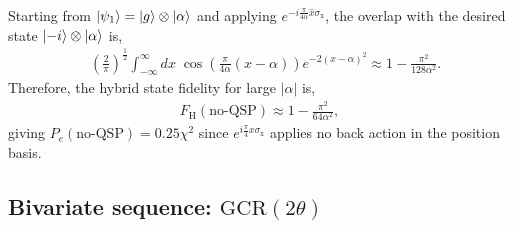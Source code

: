 \documentclass[aps,prx,showpacs,notitlepage,twocolumn,superscriptaddress,nofootinbib,preprintnumbers,floatfix,10pt, longbibliography]{revtex4-2}
\begin{document}
Starting from $\ket{\psi_1}=\ket{g}\otimes\ket{\alpha}$ and applying $e^{-i\frac{\pi}{4\alpha}\hat{x}\sigma_\mathrm{x}}$, the overlap with the desired state $\ket{-i}\otimes\ket{\alpha}$ is,
\begin{align}
&\left(\frac{2}{\pi}\right)^{\!\frac{1}{2}}
 \int_{-\infty}^{\infty}dx\;
 \cos\!\left(\frac{\pi}{4\alpha}(x-\alpha)\right)e^{-2(x-\alpha)^2}
 \approx 1-\frac{\pi^2}{128\alpha^2}.
\end{align}
Therefore, the hybrid state fidelity for large $|\alpha|$ is,
\begin{align}
F_\mathrm{H}(\mathrm{no\text{-}QSP})
\approx 1-\frac{\pi^2}{64\alpha^2}, \label{eqn:fidelity}
\end{align}
giving $P_e(\mathrm{no\text{-}QSP})=0.25\chi^2$ since $e^{i\frac{\pi}{4}x\sigma_\mathrm{x}}$ applies no back action in the position basis.

\subsection{Bivariate sequence: \texorpdfstring{$\mathrm{GCR}(2\theta)$}{GCR(2theta)}}
\label{app:error-analysis}
\end{document}
